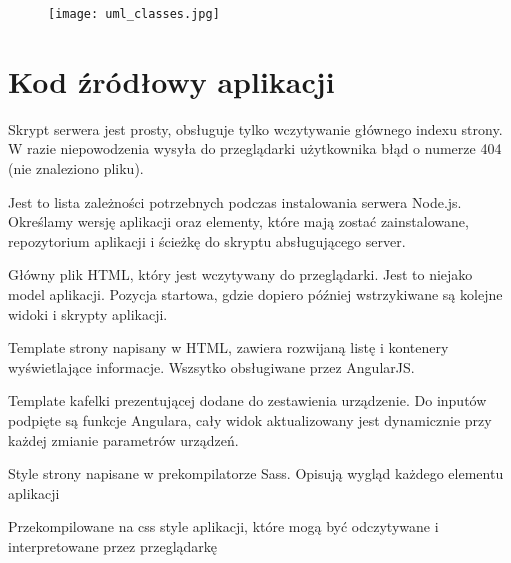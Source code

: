 \documentclass[a4paper]{article}
\begin{document}
\begin{figure}[h]
   \texttt{[image: uml\_classes.jpg]}
\end{figure}

\newpage

\section{Kod źródłowy aplikacji}



{Skrypt serwera jest prosty, obsługuje tylko wczytywanie głównego indexu strony. W razie niepowodzenia wysyła do przeglądarki użytkownika błąd o numerze 404 (nie znaleziono pliku).}
     

{Jest to lista zależności potrzebnych podczas instalowania serwera Node.js. Określamy wersję aplikacji oraz elementy, które mają zostać zainstalowane, repozytorium aplikacji i ścieżkę do skryptu absługującego server.}
     
\newpage 
 

{Główny plik HTML, który jest wczytywany do przeglądarki. Jest to niejako model aplikacji. Pozycja startowa, gdzie dopiero później wstrzykiwane są kolejne widoki i skrypty aplikacji.}


{Template strony napisany w HTML, zawiera rozwijaną listę i kontenery wyświetlające informacje. Wszsytko obsługiwane przez AngularJS.}


{Template kafelki prezentującej dodane do zestawienia urządzenie. Do inputów podpięte są funkcje Angulara, cały widok aktualizowany jest dynamicznie przy każdej zmianie parametrów urządzeń.}


{Style strony napisane w prekompilatorze Sass. Opisują wygląd każdego elementu aplikacji}


{Przekompilowane na css style aplikacji, które mogą być odczytywane i interpretowane przez przeglądarkę}
\end{document}
